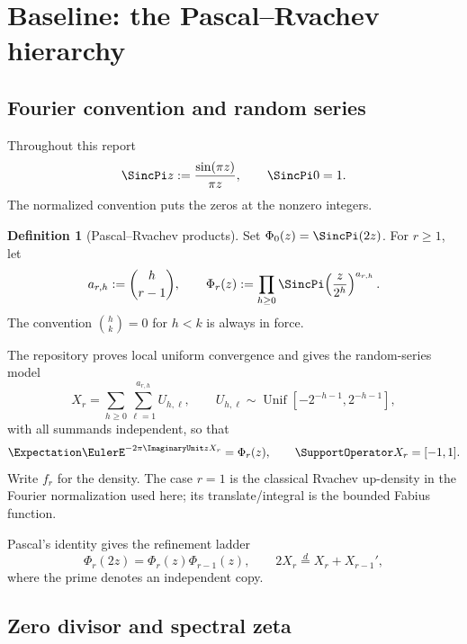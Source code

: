 \documentclass[11pt,oneside]{article}
\theoremstyle{definition}
\newtheorem{definition}[theorem]{Definition}
\theoremstyle{remark}
\begin{document}
\section{Baseline: the Pascal--Rvachev hierarchy}

\subsection{Fourier convention and random series}

Throughout this report
\[
 \SincPi z:=\frac{\sin(\pi z)}{\pi z},\qquad \SincPi0=1.
\]
The normalized convention puts the zeros at the nonzero integers.

\begin{definition}[Pascal--Rvachev products]
Set $\Phi_0(z)=\SincPi(2z)$.  For $r\geq1$, let
\begin{equation}\label{eq:Phi-r}
 a_{r,h}:=\binom{h}{r-1},\qquad
 \Phi_r(z):=\prod_{h\geq0}\SincPi\!\left(\frac{z}{2^h}\right)^{a_{r,h}}.
\end{equation}
The convention $\binom hk=0$ for $h<k$ is always in force.
\end{definition}

The repository proves local uniform convergence and gives the random-series
model
\begin{equation}\label{eq:X-r}
 X_r=\sum_{h\geq0}\sum_{\ell=1}^{a_{r,h}}U_{h,\ell},
 \qquad
 U_{h,\ell}\sim\operatorname{Unif}[-2^{-h-1},2^{-h-1}],
\end{equation}
with all summands independent, so that
\begin{equation}\label{eq:characteristic}
 \Expectation\EulerE^{-2\pi\ImaginaryUnit zX_r}=\Phi_r(z),\qquad \SupportOperator X_r=[-1,1].
\end{equation}
Write $f_r$ for the density.  The case $r=1$ is the classical Rvachev
up-density in the Fourier normalization used here; its translate/integral is
the bounded Fabius function.

Pascal's identity gives the refinement ladder
\begin{equation}\label{eq:refinement}
 \Phi_r(2z)=\Phi_r(z)\Phi_{r-1}(z),
 \qquad
 2X_r\stackrel d=X_r+X_{r-1}',
\end{equation}
where the prime denotes an independent copy.

\subsection{Zero divisor and spectral zeta}
\end{document}
